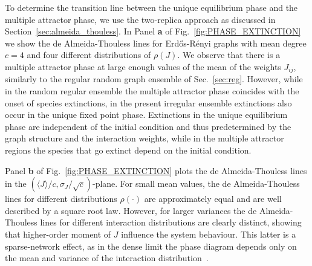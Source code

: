 \documentclass[11pt,a4paper]{article}
\newcommand{\nm}[1]{{\color{red}[NM: #1]}}
\begin{document}
To determine the transition line between the unique equilibrium phase and the multiple attractor phase, we use the two-replica approach as discussed in Section~\ref{sec:almeida_thouless}.    In Panel {\bf a}  of Fig.~\ref{fig:PHASE_EXTINCTION} we show the de Almeida-Thouless lines for Erd\H{o}s-R\'{e}nyi graphs with mean degree $c=4$ and four different distributions of $\rho(J)$.  We observe that there is a multiple attractor phase at large enough values of the mean of the weights $J_{ij}$, similarly to the regular random graph ensemble of Sec.~\ref{sec:reg}.   However, while in the random regular ensemble the multiple attractor phase coincides with the onset of  species extinctions, in the present irregular ensemble extinctions also occur in the unique fixed point phase.   Extinctions in the unique equilibrium phase are independent of the initial condition and thus predetermined by the graph structure and the interaction weights, while in the multiple attractor regions the species that go extinct depend on the initial condition.  


Panel {\bf b} of Fig.~\ref{fig:PHASE_EXTINCTION} plots the de Almeida-Thouless lines in the $(\langle J\rangle/c,\sigma_J/\sqrt{c})$-plane.     For small   mean values, the de Almeida-Thouless lines for  different distributions $\rho(\cdot)$ are approximately equal and are well described by  a square root law.  However, for larger variances the  de Almeida-Thouless lines  for different interaction distributions are clearly distinct, showing that higher-order moment of $J$ influence the system behaviour. This latter is a sparse-network effect, as  in the dense limit the phase diagram depends only on the mean and variance of the interaction distribution~\cite{bunin2017}.





\end{document}
